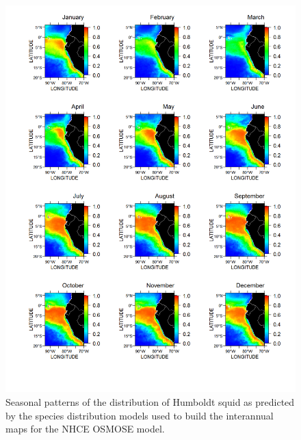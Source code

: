 \begin{figure}
\centering
\includegraphics[height=0.8\textheight]{figures/pota-climatology}
\caption[Seasonal patterns of the distribution of Humboldt squid]{Seasonal patterns of the distribution of Humboldt squid as predicted by the species distribution models used to build the interannual maps for the NHCE OSMOSE model.}
\label{fig:pota-climatology}
\end{figure}

